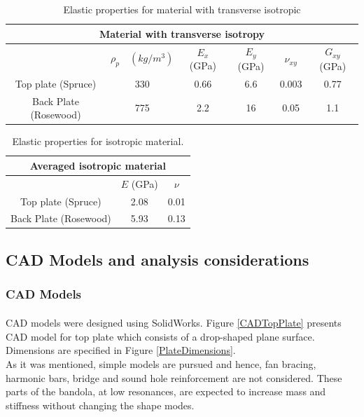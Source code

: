 \begin{table}[htb]
\centering
\begin{tabular}{|c|c|c|c|c|c|}\hline
\multicolumn{6}{|c|}{\vphantom{\LARGE Ap} Material with transverse isotropy}\\ \hline\hline
 & $\rho_p \quad (kg/m^3)$ & $E_x$ (GPa) & $E_y$ (GPa) & $\nu_{xy}$ & $G_{xy}$ (GPa)\\ \hline
Top plate (Spruce) & 330 & 0.66 & 6.6 & 0.003 & 0.77 \\ \hline
Back Plate (Rosewood) & 775 & 2.2 & 16 & 0.05 & 1.1 \\ \hline
\end{tabular}
\caption{Elastic properties for material with transverse isotropic}
\label{OrthoMat}
\end{table}

\begin{table}[htb]
\centering
\begin{tabular}{|c|c|c|}\hline
\multicolumn{3}{|c|}{\vphantom{\LARGE Ap} Averaged isotropic material}\\ \hline\hline
 & $E$ (GPa) & $\nu$ \\ \hline
Top plate (Spruce) & 2.08 & 0.01 \\ \hline
Back Plate (Rosewood) & 5.93 & 0.13 \\ \hline
\end{tabular}
\caption{Elastic properties for isotropic material.}
\label{IsoMat}
\end{table}

\subsection{CAD Models and analysis considerations}


\subsubsection{CAD Models}

CAD models were designed using SolidWorks\textsuperscript{\textregistered}. Figure \ref{CADTopPlate} presents CAD model for top plate which consists of a drop-shaped plane surface. Dimensions are specified in Figure \ref{PlateDimensions}.\\

As it was mentioned, simple models are pursued and hence, fan bracing, harmonic bars, bridge and sound hole reinforcement are not considered. These parts of the bandola, at low resonances, are expected to increase mass and stiffness without changing the shape modes.\\

